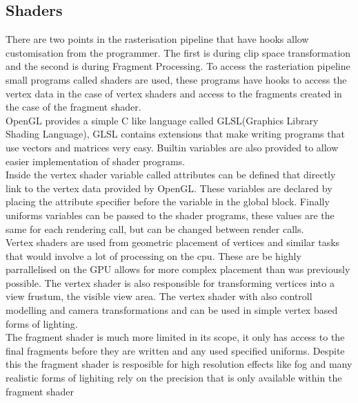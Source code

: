 \subsection{Shaders}
There are two points in the rasterisation pipeline that have hooks allow 
customisation from the programmer. The first is during clip space transformation
and the second is during Fragment Processing. To access the rasteriation pipeline
small programs called shaders are used, these programs have hooks to access the
vertex data in the case of vertex shaders and access to the fragments created in
the case of the fragment shader.\\

OpenGL provides a simple C like language called GLSL(Graphics Library Shading 
Language), GLSL contains extensions that make writing programs that use vectors
and matrices very easy. Builtin variables are also provided to allow easier
implementation of shader programs. \\



Inside the vertex shader variable called attributes can be defined that directly
link to the vertex data provided by OpenGL. These variables are declared by 
placing the attribute specifier before the variable in the global block. Finally
uniforms variables can be passed to the shader programs, these values are the 
same for each rendering call, but can be changed between render calls.\\

Vertex shaders are used from geometric placement of vertices and similar tasks
that would involve a lot of processing on the cpu. These are be highly 
parrallelised on the GPU allows for more complex placement than was previously
possible. The vertex shader is also responsible for transforming vertices into
a view frustum, the visible view area. The vertex shader with also controll 
modelling and camera transformations and can be used in simple vertex based forms
of lighting.\\

The fragment shader is much more limited in its scope, it only has access to the
final fragments before they are written and any used specified uniforms. Despite
this the fragment shader is resposible for high resolution effects like fog and
many realistic forms of lighiting rely on the precision that is only available
within the fragment shader\\



